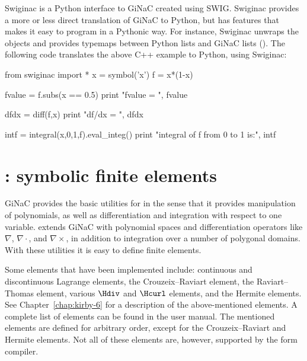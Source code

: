 Swiginac is a Python interface to GiNaC created using SWIG.  Swiginac
provides a more or less direct translation of GiNaC to Python, but has
features that makes it easy to program in a Pythonic way.  For instance,
Swiginac unwraps the  objects and provides typemaps between
Python lists and GiNaC lists ().  The following code translates
the above C++ example to Python, using Swiginac:
\begin{python}
from swiginac import *
x = symbol('x')
f = x*(1-x)

fvalue = f.subs(x == 0.5)
print "fvalue = ", fvalue

dfdx = diff(f,x)
print "df/dx = ", dfdx

intf = integral(x,0,1,f).eval_integ()
print "integral of f from 0 to 1 is:", intf
\end{python}

\section{\syfi{}: symbolic finite elements}

GiNaC provides the basic utilities for \syfi{} in the sense that it provides
manipulation of polynomials, as well as differentiation and integration
with respect to one variable. \syfi{} extends GiNaC with polynomial
spaces and differentiation operators like $\nabla$, $\nabla\cdot$, and
$\nabla\times$, in addition to integration over a number of polygonal
domains.  With these utilities it is easy to define finite elements.

Some elements that have been implemented include: continuous and
discontinuous Lagrange elements, the Crouzeix--Raviart element, the
Raviart--Thomas element, various $\Hdiv$ and $\Hcurl$ \nedelec{} elements, and
the Hermite elements. See Chapter~\ref{chap:kirby-6} for a description of
the above-mentioned elements.  A complete list of elements can be found in
the user manual. The mentioned elements are defined for arbitrary order,
except for the Crouzeix--Raviart and Hermite elements. Not all of these
elements are, however, supported by the form compiler.

